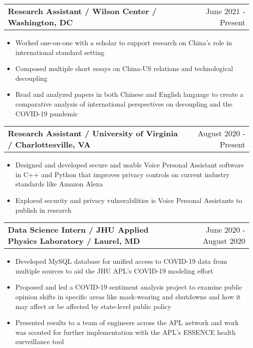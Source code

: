 \documentclass[letterpaper,11pt]{article}
\makeatletter
\newcommand{\resumeItem}[1]{
  \item\small{
    {#1} \vspace{-2pt}
  }
}
\newcommand{\resumeSubheadingTwo}[2]{
  \vspace{-1pt}\item
    \begin{tabular*}{0.97\textwidth}{l@{\extracolsep{\fill}}r}
      \textbf{#1} & #2 \\
    \end{tabular*}\vspace{-5pt}
}
\newcommand{\resumeItemListStart}{\begin{itemize}}
\newcommand{\resumeItemListEnd}{\end{itemize}\vspace{-5pt}}
\makeatother
\begin{document}
    \resumeSubheadingTwo
      {Research Assistant / Wilson Center / Washington, DC}{June 2021 - Present}
      \resumeItemListStart
        \resumeItem{Worked one-on-one with a scholar to support research on China's role in international standard setting}
        \resumeItem{Composed multiple short essays on China-US relations and technological decoupling}
        \resumeItem{Read and analyzed papers in both Chinese and English language to create a comparative analysis of international perspectives on decoupling and the COVID-19 pandemic}
      \resumeItemListEnd

    \resumeSubheadingTwo
      {Research Assistant / University of Virginia / Charlottesville, VA}{August 2020 - Present}
      \resumeItemListStart
        \resumeItem{Designed and developed secure and usable Voice Personal Assistant software in C++ and Python that improves privacy controls on current industry standards like Amazon Alexa}
        \resumeItem{Explored security and privacy vulnerabilities is Voice Personal Assistants to publish in research}
      \resumeItemListEnd

    \resumeSubheadingTwo
      {Data Science Intern / JHU Applied Physics Laboratory / Laurel, MD}{June 2020 - August 2020}
      \resumeItemListStart
        \resumeItem{Developed MySQL database for unified access to COVID-19 data from multiple sources to aid the JHU APL's COVID-19 modeling effort}
        \resumeItem{Proposed and led a COVID-19 sentiment analysis project to examine public opinion shifts in specific areas like mask-wearing and shutdowns and how it may affect or be affected by state-level public policy}
        \resumeItem{Presented results to a team of engineers across the APL network and work was scouted for further implementation with the APL's ESSENCE health surveillance tool}
      \resumeItemListEnd
      

      
\end{document}
